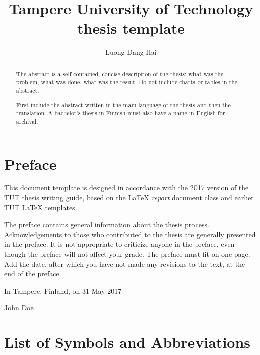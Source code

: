 \documentclass[twoside,draftfooter]{tutthesis} %
\author{Luong Dang Hai}
\title{Tampere University of Technology thesis template}
\begin{document}
\maketitle



\begin{abstract}
The abstract is a self-contained, concise description of the thesis: what was the problem, what was done, what was the result.
Do not include charts or tables in the abstract.

First include the abstract written in the main language of the thesis and then the translation.
A bachelor's thesis in Finnish must also have a name in English for archival.
\end{abstract}


\chapter*{Preface}

This document template is designed in accordance with the 2017 version of the TUT thesis writing guide, based on the LaTeX \emph{report} document class and earlier TUT LaTeX templates.

The preface contains general information about the thesis process.
Acknowledgements to those who contributed to the thesis are generally presented in the preface.
It is not appropriate to criticize anyone in the preface, even though the preface will not affect your grade.
The preface must fit on one page.
Add the date, after which you have not made any revisions to the text, at the end of the preface.

\vspace{2\baselineskip}

In Tampere, Finland, on 31 May 2017

\vspace{2\baselineskip}

John Doe



\tableofcontents

\listoffigures



\chapter*{List of Symbols and Abbreviations}
\end{document}
